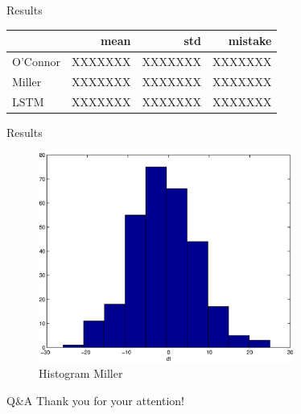\documentclass{beamer}
\newcommand{\ra}[1]{\renewcommand{\arraystretch}{#1}}
\begin{document}
\begin{frame}{Results}
    \begin{table}[H]
        \begin{center}
        \ra{1.2}
        \begin{tabular}{@{} lrrr @{}}
        \toprule
        {} & mean & std & mistake \\
        \midrule
        O'Connor  &     XXXXXXX &    XXXXXXX &    XXXXXXX \\
        Miller    &     XXXXXXX &    XXXXXXX &    XXXXXXX \\
        LSTM      &     XXXXXXX &    XXXXXXX &    XXXXXXX \\
        \bottomrule
        \end{tabular}
        \end{center}
    \end{table}
\end{frame}

\begin{frame}{Results}
    \begin{figure}
    \begin{center}
        \includegraphics[width=0.75\textwidth]{figures/hist_miller.eps}
        \caption{Histogram Miller}
        \label{fig:hist_miller}
    \end{center}
    \end{figure}
\end{frame}

\begin{frame}{Q\&A}
    \Large
    \centering
    Thank you for your attention!
\end{frame}
\end{document}
